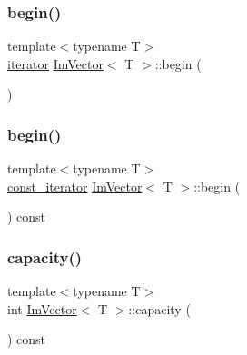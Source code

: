 \subsubsection{\texorpdfstring{begin()}{begin()}\hspace{0.1cm}{\footnotesize\ttfamily [1/2]}}
{\footnotesize\ttfamily template$<$typename T$>$ \\
\hyperlink{class_im_vector_a74b5478f1f6fd471cc71219bce483db6}{iterator} \hyperlink{class_im_vector}{Im\+Vector}$<$ T $>$\+::begin (\begin{DoxyParamCaption}{ }\end{DoxyParamCaption})}

\hypertarget{class_im_vector_ac72cd4105b5c6a7f76157df945b39d4c}{}\label{class_im_vector_ac72cd4105b5c6a7f76157df945b39d4c} 
\subsubsection{\texorpdfstring{begin()}{begin()}\hspace{0.1cm}{\footnotesize\ttfamily [2/2]}}
{\footnotesize\ttfamily template$<$typename T$>$ \\
\hyperlink{class_im_vector_aedeac9c5080f9d6ce96ae837768ee4c4}{const\+\_\+iterator} \hyperlink{class_im_vector}{Im\+Vector}$<$ T $>$\+::begin (\begin{DoxyParamCaption}{ }\end{DoxyParamCaption}) const}

\hypertarget{class_im_vector_ac17681baa8b9b5cd97e556da29f9ef73}{}\label{class_im_vector_ac17681baa8b9b5cd97e556da29f9ef73} 
\subsubsection{\texorpdfstring{capacity()}{capacity()}}
{\footnotesize\ttfamily template$<$typename T$>$ \\
int \hyperlink{class_im_vector}{Im\+Vector}$<$ T $>$\+::capacity (\begin{DoxyParamCaption}{ }\end{DoxyParamCaption}) const}

\hypertarget{class_im_vector_ae2d401b4ec5f1113cdb8edb5a61a38f7}{}\label{class_im_vector_ae2d401b4ec5f1113cdb8edb5a61a38f7} 
